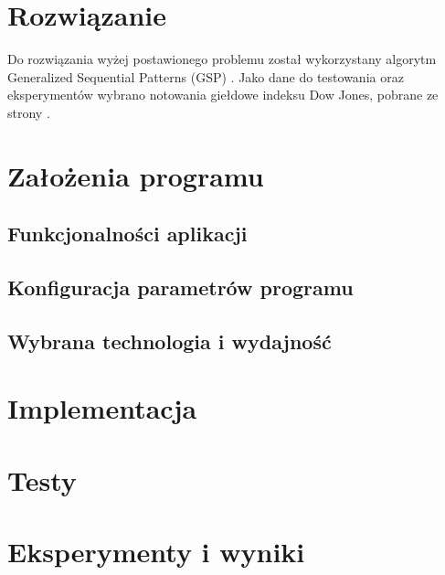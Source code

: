 \documentclass[11pt,a4paper]{article}
\begin{document}
\section{Rozwiązanie}
\label{sec:rozwiazanie}
Do rozwiązania wyżej postawionego problemu został wykorzystany algorytm Generalized Sequential Patterns (GSP) \cite{bib:GSP}. Jako dane do testowania oraz eksperymentów wybrano notowania giełdowe indeksu Dow Jones, pobrane ze strony \cite{bib:DowJones}.

\section{Założenia programu}

\subsection{Funkcjonalności aplikacji}
\subsection{Konfiguracja parametrów programu}
\subsection{Wybrana technologia i wydajność}

\section{Implementacja}

\section{Testy}

\section{Eksperymenty i wyniki}
\nocite{*}


\end{document}

